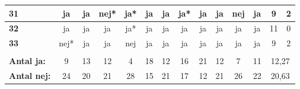 \begin{table}[H]
\begin{tabular}{l|c|c|c|c|c|c|c|c|c|c|c|c|c}
\cellcolor[HTML]{C0C0C0}\textbf{31}	&ja	&ja	&nej*&ja*	&ja	&ja	&ja*	&ja	&ja	&nej&	ja  & \cellcolor[HTML]{EFEFEF}9 & \cellcolor[HTML]{EFEFEF}2  \\ \hline
\cellcolor[HTML]{C0C0C0}\textbf{32}	&\cellcolor[HTML]{D4EED3}ja	&\cellcolor[HTML]{D4EED3}ja	&\cellcolor[HTML]{D4EED3}ja	&\cellcolor[HTML]{D4EED3}ja*	&\cellcolor[HTML]{D4EED3}ja	&\cellcolor[HTML]{D4EED3}ja	&\cellcolor[HTML]{D4EED3}ja	&\cellcolor[HTML]{D4EED3}ja	&\cellcolor[HTML]{D4EED3}ja	&\cellcolor[HTML]{D4EED3}ja	&\cellcolor[HTML]{D4EED3}ja  & \cellcolor[HTML]{EFEFEF}11 & \cellcolor[HTML]{EFEFEF}0\\ \hline
\cellcolor[HTML]{C0C0C0}\textbf{33}	&nej*&	ja	&ja	&nej	&ja	&ja	&ja	&ja	&ja	&ja	&ja & \cellcolor[HTML]{EFEFEF}9 & \cellcolor[HTML]{EFEFEF}2\\ \hline%
\rowcolor[HTML]{EFEFEF}\multicolumn{14}{r}{\textbf{Gennemsnit}}\\
\rowcolor[HTML]{EFEFEF}\textbf{Antal ja:} & 9 & 13 &	12&	4	&18&	12&	16&	21&	12&	7&	11 & \multicolumn{2}{c}{12,27}\\ \hline
\rowcolor[HTML]{EFEFEF}\textbf{Antal nej:} &24 &	20&	21&	28&	15&	21&	17&	12&	21&	26&	22 &\multicolumn{2}{c}{20,63} \\
\end{tabular}
\end{table}

